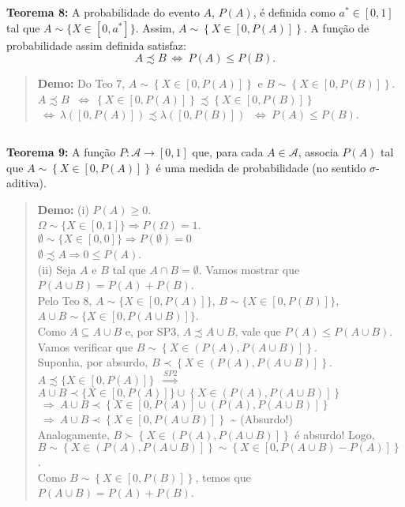 \documentclass[
]{book}
\begin{document}
\textbf{Teorema 8:} A probabilidade do evento \(A\), \(P(A)\), é definida como \(a^* \in [0,1]\) tal que \(A \sim \{X \in [0,a^*]\}\). Assim, \(A \sim \left\{X \in \left[0,P(A)\right]\right\}\). A função de probabilidade assim definida satisfaz:
\[A \precsim B ~\Leftrightarrow~ P(A) \leq P(B).\]

\begin{quote}
\textbf{Demo:} Do Teo 7, \(A \sim \left\{X \in \left[0,P(A)\right]\right\}\) e \(B \sim \left\{X \in \left[0,P(B)\right]\right\}\).\\
\(A \precsim B\) \(~\Leftrightarrow~ \left\{X \in \left[0,P(A)\right]\right\} \precsim \left\{X \in \left[0,P(B)\right]\right\}\) \(~\Leftrightarrow~ \lambda \left([0,P(A)]\right) \precsim \lambda \left([0,P(B)]\right)\) \(~\Leftrightarrow~ P(A) \leq P(B).\)
\end{quote}

\(~\)

\textbf{Teorema 9:} A função \(P: \mathcal{A} \longrightarrow [0,1]\) que, para cada \(A \in \mathcal{A}\), associa \(P(A)\) tal que \(A \sim \left\{X \in \left[0,P(A)\right]\right\}\) é uma medida de probabilidade (no sentido \(\sigma\)-aditiva).

\begin{quote}
\textbf{Demo:}
(i) \(P(A) \geq 0\).\\
\(\Omega \sim \{X \in [0,1]\}\Rightarrow P(\Omega)=1\).\\
\(\emptyset \sim \{X \in [0,0]\} \Rightarrow P(\emptyset)=0\)\\
\(\emptyset \precsim A \Rightarrow 0 \leq P(A)\).\\
\(~\)\\
(ii) Seja \(A\) e \(B\) tal que \(A \cap B = \emptyset\). Vamos mostrar que \(P(A \cup B) = P(A) + P(B)\).\\
Pelo Teo 8, \(A \sim \{ X \in [0,P(A)]\}\), \(B \sim \{ X \in [0,P(B)]\}\), \(A \cup B \sim \{ X \in [0,P(A \cup B)]\}\).\\
Como \(A \subseteq A \cup B\) e, por SP3, \(A \precsim A \cup B\), vale que \(P(A) \leq P(A \cup B)\). Vamos verificar que \(B \sim \left\{X \in \left(P(A),P(A \cup B) \right]\right\}\).\\
Suponha, por absurdo, \(B \prec \left\{X \in \left(P(A),P(A \cup B) \right]\right\}\).\\
\(A \precsim \{X \in [0,P(A)]\}\) \(~\overset{SP2}{\Longrightarrow}~\)
\(A \cup B \prec \{X \in [0,P(A)]\} \cup \left\{X \in \left(P(A),P(A \cup B) \right]\right\}\)
\(~\Rightarrow~ A \cup B \prec \left\{X \in [0,P(A)] \cup \left(P(A),P(A \cup B) \right]\right\}\)
\(~\Rightarrow~ A \cup B \prec \left\{X \in \left[0,P(A \cup B) \right]\right\}\) \textasciitilde{} (Absurdo!)\\
Analogamente, \(B \succ \left\{X \in \left(P(A),P(A \cup B) \right]\right\}\) é absurdo! Logo, \(B \sim \left\{X \in \left(P(A),P(A \cup B) \right]\right\} \sim \left\{X \in \left[0, P(A \cup B)-P(A) \right]\right\}\).\\
Como \(B \sim \left\{X \in \left[0,P(B)\right]\right\}\), temos que \(P(A \cup B) = P(A) + P(B)\).
\end{quote}
\end{document}
